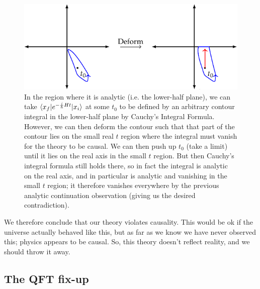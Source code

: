 \begin{figure}[htbp]
    \centering
    \includegraphics[]{Images/fig-RQMcontourintegral.pdf}

    \caption{In the region where it is analytic (i.e. the lower-half plane), we can take $\langle x_f \rvert e^{-\frac{i}{\hbar}Ht}\lvert x_i \rangle$ at some $t_0$ to be defined by an arbitrary contour integral in the lower-half plane by Cauchy's Integral Formula. However, we can then deform the contour such that that part of the contour lies on the small real $t$ region where the integral must vanish for the theory to be causal. We can then push up $t_0$ (take a limit) until it lies on the real axis in the small $t$ region. But then Cauchy's integral formula still holds there, so in fact the integral is analytic on the real axis, and in particular is analytic and vanishing in the small $t$ region; it therefore vanishes everywhere by the previous analytic continuation observation (giving us the desired contradiction).}
    \label{fig-RQMcontourintegral}
\end{figure}

We therefore conclude that our theory violates causality. This would be ok if the universe actually behaved like this, but as far as we know we have never observed this; physics appears to be causal. So, this theory doesn't reflect reality, and we should throw it away.

\newpage 
\subsection{The QFT fix-up}

